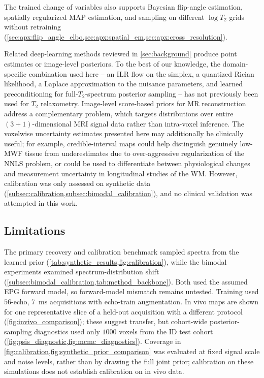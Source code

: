 The trained change of variables also supports Bayesian flip-angle estimation, spatially regularized \gls*{MAP} estimation, and sampling on different $\log T_2$ grids without retraining (\cref{sec:apx:flip_angle_elbo,sec:apx:spatial_em,sec:apx:cross_resolution}).

Related deep-learning methods reviewed in \cref{sec:background} produce point estimates or image-level posteriors.
To the best of our knowledge, the domain-specific combination used here -- an \gls*{ILR} flow on the simplex, a quantized Rician likelihood, a Laplace approximation to the nuisance parameters, and learned preconditioning for full-$T_2$-spectrum posterior sampling -- has not previously been used for $T_2$ relaxometry.
Image-level score-based priors for \gls*{MR} reconstruction~\citep{jalal_robust_2021} address a complementary problem, which targets distributions over entire $(3+1)$-dimensional \gls*{MRI} signal data rather than intra-voxel inference.
The voxelwise uncertainty estimates presented here may additionally be clinically useful;
for example, credible-interval maps could help distinguish genuinely low-\gls*{MWF} tissue from underestimates due to over-aggressive regularization of the \gls*{NNLS} problem, or could be used to differentiate between physiological changes and measurement uncertainty in longitudinal studies of the \gls*{WM}.
However, calibration was only assessed on synthetic data (\cref{subsec:calibration,subsec:bimodal_calibration}), and no clinical validation was attempted in this work.

\subsection{Limitations}

The primary recovery and calibration benchmark sampled spectra from the learned prior (\cref{tab:synthetic_results,fig:calibration}), while the bimodal experiments examined spectrum-distribution shift (\cref{subsec:bimodal_calibration,tab:method_backbone}).
Both used the assumed \gls*{EPG} forward model, so forward-model mismatch remains untested.
Training used $56$-echo, \SI{7}{\ms} acquisitions with echo-train augmentation.
In vivo maps are shown for one representative slice of a held-out acquisition with a different protocol (\cref{fig:invivo_comparison});
these suggest transfer, but cohort-wide posterior-sampling diagnostics used only $\num{1000}$ voxels from the ID test cohort (\cref{fig:psis_diagnostic,fig:mcmc_diagnostics}).
Coverage in \cref{fig:calibration,fig:synthetic_prior_comparison} was evaluated at fixed signal scale and noise levels, rather than by drawing the full joint prior;
calibration on these simulations does not establish calibration on in vivo data.

